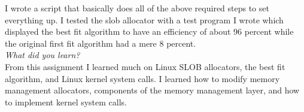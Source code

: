 \documentclass[letterpaper,10pt,titlepage]{article}
\begin{document}
I wrote a script that basically does all of the above required steps to set everything up. I tested the slob allocator with a test program I wrote which displayed the best fit algorithm to have an efficiency of about 96 percent while the original first fit algorithm had a mere 8 percent.\\

\textit{What did you learn?}\\

From this assignment I learned much on Linux SLOB allocators, the best fit algorithm, and Linux kernel system calls. I learned how to modify memory management allocators, components of the memory management layer, and how to implement kernel system calls.\\
\end{document}
